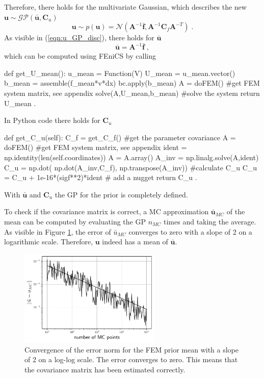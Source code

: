 \documentclass[%
  a4paper,oneside,%
  11pt,%
  smallchapters,
  style=printdev,
  extramargin,
  green,%
  rgb, <cmyk>
  ]{tubsbook}
\begin{document}
%	
Therefore, there holds for the multivariate Gaussian, which describes the new $\bm{u} \sim \mathcal{GP}(\bar{\bm{u}}, \bm{C}_u)$
\begin{equation}
\bm{u} \sim p(\bm{u}) = \mathcal{N} \left( \bm{A}^{-1} \bar{\bm{f}}, \bm{A}^{-1} \bm{C}_f \bm{A}^{-T}  \right) \;.
\label{eqn:u_GP_disc}
\end{equation}
As visible in (\ref{eqn:u_GP_disc}), there holds for $\bar{\bm{u}}$
\begin{equation}
\bar{\bm{u}} = \bm{A}^{-1} \bar{\bm{f}} \; ,
\label{eqn:meanEqSys}
\end{equation}
which can be computed using FEniCS by calling
\begin{python}
def get_U_mean():
	u_mean = Function(V)
	U_mean = u_mean.vector()
	b_mean = assemble(f_mean*v*dx) 
	bc.apply(b_mean)
	A = doFEM()  #get FEM system matrix, see appendix
	solve(A,U_mean,b_mean) #solve the system
	return U_mean .
\end{python}
\label{lst:get_u_mean}
In Python code there holds for $\bm{C}_u$
\begin{python}
def get_C_u(self):
	C_f = get_C_f() #get the parameter covariance
	A = doFEM() #get FEM system matrix, see appendix
	ident = np.identity(len(self.coordinates))
	A = A.array()
	A_inv = np.linalg.solve(A,ident)
	C_u = np.dot( np.dot(A_inv,C_f), np.transpose(A_inv)) #calculate C_u
	C_u = C_u + 1e-16*(sigf**2)*ident # add a nugget
	return C_u .
\end{python}
\label{lst:get_C_u}
With $\bar{\bm{u}}$ and $\bm{C}_u$ the GP for the prior is completely defined. 

To check if the covariance matrix is correct, a MC approximation $\bar{\bm{u}}_{MC}$ of the mean can be computed by evaluating the GP $n_{MC}$ times and taking the average. As visible in Figure \ref{fig:u_mean_conv}, the error of $\bar{u}_{MC}$ converges to zero with a slope of 2 on a logarithmic scale. Therefore, $\bm{u}$ indeed has a mean of $\bar{\bm{u}}$.
\begin{figure}[!ht]
\includegraphics[width=0.6\textwidth]{pics/MCerrorConv.pdf}
\centering
\caption[Convergence of the error norm of the FEM prior]{Convergence of the error norm for the FEM prior mean with a slope of 2 on a log-log scale. The error converges to zero. This means that the covariance matrix has been estimated correctly.}
\label{fig:u_mean_conv}
\end{figure}
\end{document}
